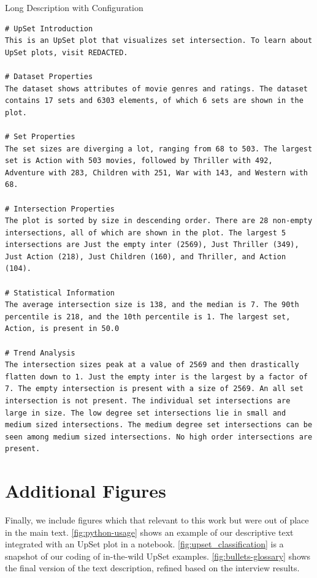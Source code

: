 \documentclass{egpubl}
\begin{document}
Long Description with Configuration

\small
\begin{lstlisting}
# UpSet Introduction
This is an UpSet plot that visualizes set intersection. To learn about UpSet plots, visit REDACTED.

# Dataset Properties
The dataset shows attributes of movie genres and ratings. The dataset contains 17 sets and 6303 elements, of which 6 sets are shown in the plot.

# Set Properties
The set sizes are diverging a lot, ranging from 68 to 503. The largest set is Action with 503 movies, followed by Thriller with 492, Adventure with 283, Children with 251, War with 143, and Western with 68.

# Intersection Properties
The plot is sorted by size in descending order. There are 28 non-empty intersections, all of which are shown in the plot. The largest 5 intersections are Just the empty inter (2569), Just Thriller (349), Just Action (218), Just Children (160), and Thriller, and Action (104).

# Statistical Information
The average intersection size is 138, and the median is 7. The 90th percentile is 218, and the 10th percentile is 1. The largest set, Action, is present in 50.0

# Trend Analysis
The intersection sizes peak at a value of 2569 and then drastically flatten down to 1. Just the empty inter is the largest by a factor of 7. The empty intersection is present with a size of 2569. An all set intersection is not present. The individual set intersections are large in size. The low degree set intersections lie in small and medium sized intersections. The medium degree set intersections can be seen among medium sized intersections. No high order intersections are present.

\end{lstlisting}
\normalsize

\section{Additional Figures}
\label{sec:addtional-figures}

Finally, we include figures which that relevant to this work but were out of place in the main text.
\autoref{fig:python-usage} shows an example of our descriptive text integrated with an UpSet plot in a notebook.
\autoref{fig:upset_classification} is a snapshot of our coding of in-the-wild UpSet examples.
\autoref{fig:bullets-glossary} shows the final version of the text description, refined based on the interview results.
\end{document}
